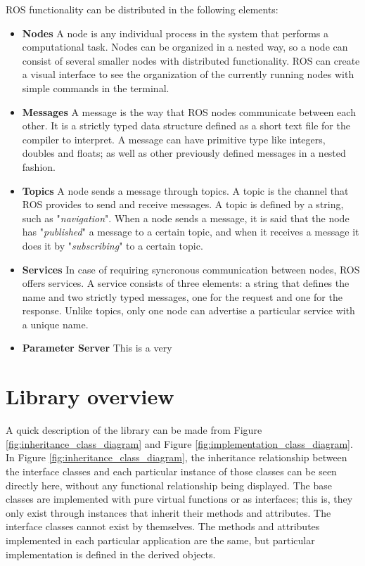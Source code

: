 ROS functionality can be distributed in the following elements:

\begin{itemize}

\item \textbf{Nodes} A node is any individual process in the system that performs a computational task. Nodes can be organized in a nested way, so a node can consist of several smaller nodes with distributed functionality. ROS can create a visual interface to see the organization of the currently running nodes with simple commands in the terminal.

\item \textbf{Messages} A message is the way that ROS nodes communicate between each other. It is a strictly typed data structure defined as a short text file for the compiler to interpret. A message can have primitive type like integers, doubles and floats; as well as other previously defined messages in a nested fashion.

\item \textbf{Topics} A node sends a message through topics. A topic is the channel that ROS provides to send and receive messages. A topic is defined by a string, such as "\emph{navigation}". When a node sends a message, it is said that the node has "\emph{published}" a message to a certain topic, and when it receives a message it does it by "\emph{subscribing}" to a certain topic.

\item \textbf{Services} In case of requiring syncronous communication between nodes, ROS offers services. A service consists of three elements: a string that defines the name and two strictly typed messages, one for the request and one for the response. Unlike topics, only one node can advertise a particular service with a unique name. 

\item \textbf{Parameter Server} This is a very 

\end{itemize}

\section{Library overview}

A quick description of the library can be made from Figure \ref{fig:inheritance_class_diagram} and Figure \ref{fig:implementation_class_diagram}. In Figure \ref{fig:inheritance_class_diagram}, the inheritance relationship between the interface classes and each particular instance of those classes can be seen directly here, without any functional relationship being displayed. The base classes are implemented with pure virtual functions or as interfaces; this is, they only exist through instances that inherit their methods and attributes. The interface classes cannot exist by themselves. The methods and attributes implemented in each particular application are the same, but particular implementation is defined in the derived objects.\\

